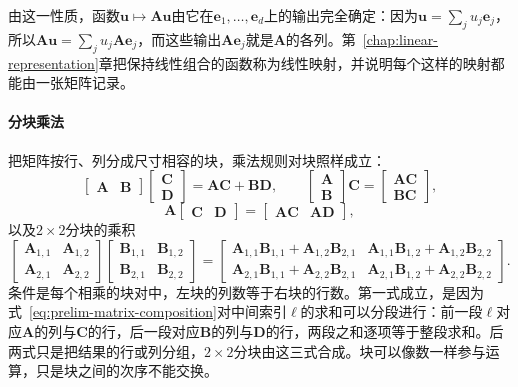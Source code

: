由这一性质，函数$\bm u\mapsto\bm A\bm u$由它在$\bm e_1,\ldots,\bm e_d$上的输出完全确定：因为$\bm u=\sum_ju_j\bm e_j$，所以$\bm A\bm u=\sum_ju_j\bm A\bm e_j$，而这些输出$\bm A\bm e_j$就是$\bm A$的各列。第~\ref{chap:linear-representation}章把保持线性组合的函数称为线性映射，并说明每个这样的映射都能由一张矩阵记录。

\paragraph{分块乘法}
把矩阵按行、列分成尺寸相容的块，乘法规则对块照样成立：
\[
 \begin{bmatrix}\bm A&\bm B\end{bmatrix}\begin{bmatrix}\bm C\\\bm D\end{bmatrix}=\bm A\bm C+\bm B\bm D,
 \qquad
 \begin{bmatrix}\bm A\\\bm B\end{bmatrix}\bm C=\begin{bmatrix}\bm A\bm C\\\bm B\bm C\end{bmatrix},
\]
\[
 \bm A\begin{bmatrix}\bm C&\bm D\end{bmatrix}=\begin{bmatrix}\bm A\bm C&\bm A\bm D\end{bmatrix},
\]
以及$2\times2$分块的乘积
\[
 \begin{bmatrix}\bm A_{1,1}&\bm A_{1,2}\\\bm A_{2,1}&\bm A_{2,2}\end{bmatrix}
 \begin{bmatrix}\bm B_{1,1}&\bm B_{1,2}\\\bm B_{2,1}&\bm B_{2,2}\end{bmatrix}
 =\begin{bmatrix}
  \bm A_{1,1}\bm B_{1,1}+\bm A_{1,2}\bm B_{2,1}&\bm A_{1,1}\bm B_{1,2}+\bm A_{1,2}\bm B_{2,2}\\
  \bm A_{2,1}\bm B_{1,1}+\bm A_{2,2}\bm B_{2,1}&\bm A_{2,1}\bm B_{1,2}+\bm A_{2,2}\bm B_{2,2}
 \end{bmatrix}.
\]
条件是每个相乘的块对中，左块的列数等于右块的行数。第一式成立，是因为式~\eqref{eq:prelim-matrix-composition}对中间索引$\ell$的求和可以分段进行：前一段$\ell$对应$\bm A$的列与$\bm C$的行，后一段对应$\bm B$的列与$\bm D$的行，两段之和逐项等于整段求和。后两式只是把结果的行或列分组，$2\times2$分块由这三式合成。块可以像数一样参与运算，只是块之间的次序不能交换。

